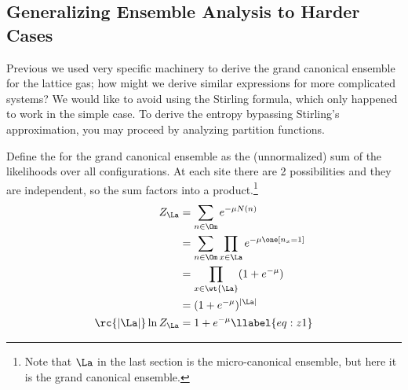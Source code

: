 

\subsection{Generalizing Ensemble Analysis to Harder Cases}

Previous we used very specific machinery to derive the grand canonical ensemble for the lattice gas; how might we derive similar expressions for more complicated systems?  We would like to avoid using the Stirling formula, which only happened to work in the simple case. 
To derive the entropy bypassing Stirling's approximation, you may proceed by analyzing partition functions. 

Define the  for the grand canonical ensemble as the (unnormalized) sum of the likelihoods over all configurations. At each site there are 2 possibilities and they are independent, so the sum factors into a product.\footnote{Note that $\La$ in the last section is the micro-canonical ensemble, but here it is the grand canonical ensemble.}
\begin{align}
\nonumber
Z_\La & = \sum_{n\in \Om} e^{-\mu N(n)} \\
\nonumber
&=\sum_{n\in \Om} \prod_{x\in \La} e^{-\mu \one[n_x=1]}\\
\nonumber
&=\prod_{x\in \wt{\La}}(1+e^{-\mu})\\
\nonumber
&= (1+e^{-\mu})^{|\La|}\\
\rc{|\La|} \ln Z_{\La} &= 1+e^{-\mu}
\llabel{eq:z1}
\end{align}

